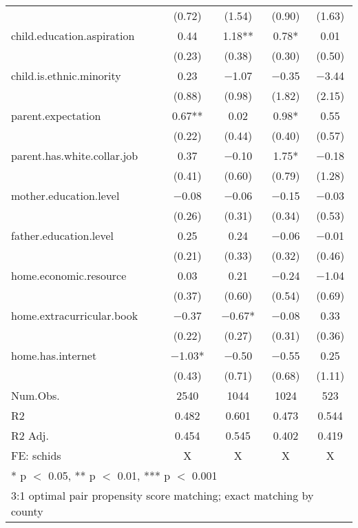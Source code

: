 \documentclass[
  man,floatsintext]{apa7}
\begin{document}
\begin{table}
\begin{tabular}[t]{lcccc}
 & (\num{0.72}) & (\num{1.54}) & (\num{0.90}) & (\num{1.63})\\
child.education.aspiration & \num{0.44} & \num{1.18}** & \num{0.78}* & \num{0.01}\\
 & (\num{0.23}) & (\num{0.38}) & (\num{0.30}) & (\num{0.50})\\
child.is.ethnic.minority & \num{0.23} & \num{-1.07} & \num{-0.35} & \num{-3.44}\\
 & (\num{0.88}) & (\num{0.98}) & (\num{1.82}) & (\num{2.15})\\
parent.expectation & \num{0.67}** & \num{0.02} & \num{0.98}* & \num{0.55}\\
 & (\num{0.22}) & (\num{0.44}) & (\num{0.40}) & (\num{0.57})\\
parent.has.white.collar.job & \num{0.37} & \num{-0.10} & \num{1.75}* & \num{-0.18}\\
 & (\num{0.41}) & (\num{0.60}) & (\num{0.79}) & (\num{1.28})\\
mother.education.level & \num{-0.08} & \num{-0.06} & \num{-0.15} & \num{-0.03}\\
 & (\num{0.26}) & (\num{0.31}) & (\num{0.34}) & (\num{0.53})\\
father.education.level & \num{0.25} & \num{0.24} & \num{-0.06} & \num{-0.01}\\
 & (\num{0.21}) & (\num{0.33}) & (\num{0.32}) & (\num{0.46})\\
home.economic.resource & \num{0.03} & \num{0.21} & \num{-0.24} & \num{-1.04}\\
 & (\num{0.37}) & (\num{0.60}) & (\num{0.54}) & (\num{0.69})\\
home.extracurricular.book & \num{-0.37} & \num{-0.67}* & \num{-0.08} & \num{0.33}\\
 & (\num{0.22}) & (\num{0.27}) & (\num{0.31}) & (\num{0.36})\\
home.has.internet & \num{-1.03}* & \num{-0.50} & \num{-0.55} & \num{0.25}\\
 & (\num{0.43}) & (\num{0.71}) & (\num{0.68}) & (\num{1.11})\\
\midrule
Num.Obs. & \num{2540} & \num{1044} & \num{1024} & \num{523}\\
R2 & \num{0.482} & \num{0.601} & \num{0.473} & \num{0.544}\\
R2 Adj. & \num{0.454} & \num{0.545} & \num{0.402} & \num{0.419}\\
FE: schids & X & X & X & X\\
\bottomrule
\multicolumn{5}{l}{\rule{0pt}{1em}* p $<$ 0.05, ** p $<$ 0.01, *** p $<$ 0.001}\\
\multicolumn{5}{l}{\rule{0pt}{1em}3:1 optimal pair propensity score matching; exact matching by county}\\
\end{tabular}
\end{table}
\end{document}
